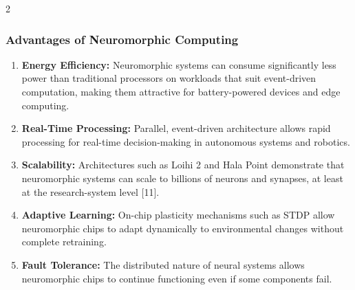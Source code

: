 \begin{multicols}{2}
  \subsubsection*{Advantages of Neuromorphic Computing}
  \begin{enumerate}
    \item \textbf{Energy Efficiency:} Neuromorphic systems can consume significantly less power than traditional processors on workloads that suit event-driven computation, making them attractive for battery-powered devices and edge computing.
    \item \textbf{Real-Time Processing:} Parallel, event-driven architecture allows rapid processing for real-time decision-making in autonomous systems and robotics.
    \item \textbf{Scalability:} Architectures such as Loihi 2 and Hala Point demonstrate that neuromorphic systems can scale to billions of neurons and synapses, at least at the research-system level [11].
    \item \textbf{Adaptive Learning:} On-chip plasticity mechanisms such as STDP allow neuromorphic chips to adapt dynamically to environmental changes without complete retraining.
    \item \textbf{Fault Tolerance:} The distributed nature of neural systems allows neuromorphic chips to continue functioning even if some components fail.
  \end{enumerate}


\end{multicols}
